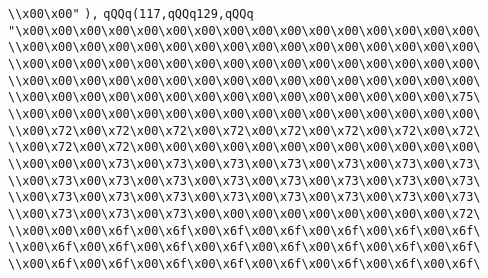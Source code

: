 \verb|\\x00\x00"|\newline
\verb|),|\newline
\verb|qQQq(117,qQQq129,qQQq|\newline
\verb|"\x00\x00\x00\x00\x00\x00\x00\x00\x00\x00\x00\x00\x00\x00\x00\x00\|\newline
\verb|\\x00\x00\x00\x00\x00\x00\x00\x00\x00\x00\x00\x00\x00\x00\x00\x00\|\newline
\verb|\\x00\x00\x00\x00\x00\x00\x00\x00\x00\x00\x00\x00\x00\x00\x00\x00\|\newline
\verb|\\x00\x00\x00\x00\x00\x00\x00\x00\x00\x00\x00\x00\x00\x00\x00\x00\|\newline
\verb|\\x00\x00\x00\x00\x00\x00\x00\x00\x00\x00\x00\x00\x00\x00\x00\x75\|\newline
\verb|\\x00\x00\x00\x00\x00\x00\x00\x00\x00\x00\x00\x00\x00\x00\x00\x00\|\newline
\verb|\\x00\x72\x00\x72\x00\x72\x00\x72\x00\x72\x00\x72\x00\x72\x00\x72\|\newline
\verb|\\x00\x72\x00\x72\x00\x00\x00\x00\x00\x00\x00\x00\x00\x00\x00\x00\|\newline
\verb|\\x00\x00\x00\x73\x00\x73\x00\x73\x00\x73\x00\x73\x00\x73\x00\x73\|\newline
\verb|\\x00\x73\x00\x73\x00\x73\x00\x73\x00\x73\x00\x73\x00\x73\x00\x73\|\newline
\verb|\\x00\x73\x00\x73\x00\x73\x00\x73\x00\x73\x00\x73\x00\x73\x00\x73\|\newline
\verb|\\x00\x73\x00\x73\x00\x73\x00\x00\x00\x00\x00\x00\x00\x00\x00\x72\|\newline
\verb|\\x00\x00\x00\x6f\x00\x6f\x00\x6f\x00\x6f\x00\x6f\x00\x6f\x00\x6f\|\newline
\verb|\\x00\x6f\x00\x6f\x00\x6f\x00\x6f\x00\x6f\x00\x6f\x00\x6f\x00\x6f\|\newline
\verb|\\x00\x6f\x00\x6f\x00\x6f\x00\x6f\x00\x6f\x00\x6f\x00\x6f\x00\x6f\|\newline
